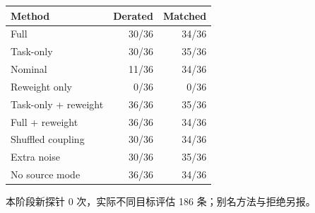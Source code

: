 \begin{center}\small
\begin{tabular}{lrr}
\toprule
Method & Derated & Matched\\
\midrule
Full & 30/36 & 34/36\\
Task-only & 30/36 & 35/36\\
Nominal & 11/36 & 34/36\\
Reweight only & 0/36 & 0/36\\
Task-only + reweight & 36/36 & 35/36\\
Full + reweight & 36/36 & 34/36\\
Shuffled coupling & 30/36 & 34/36\\
Extra noise & 30/36 & 35/36\\
No source mode & 36/36 & 34/36\\
\bottomrule
\end{tabular}
\end{center}
本阶段新探针 0 次，实际不同目标评估 186 条；别名方法与拒绝另报。

